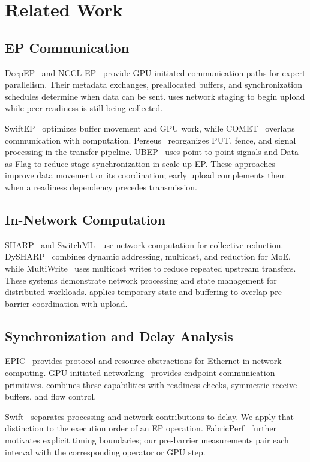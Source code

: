\section{Related Work}
\label{sec:related}

\subsection{EP Communication}
DeepEP~\cite{deepep} and NCCL EP~\cite{ncclep} provide GPU-initiated communication paths for expert parallelism. Their metadata exchanges, preallocated buffers, and synchronization schedules determine when data can be sent. \sys{} uses network staging to begin upload while peer readiness is still being collected.

SwiftEP~\cite{swiftep} optimizes buffer movement and GPU work, while COMET~\cite{comet} overlaps communication with computation. Perseus~\cite{perseus} reorganizes PUT, fence, and signal processing in the transfer pipeline. UBEP~\cite{ubep} uses point-to-point signals and Data-as-Flag to reduce stage synchronization in scale-up EP. These approaches improve data movement or its coordination; early upload complements them when a readiness dependency precedes transmission.

\subsection{In-Network Computation}
SHARP~\cite{sharp} and SwitchML~\cite{switchml} use network computation for collective reduction. DySHARP~\cite{dysharp} combines dynamic addressing, multicast, and reduction for MoE, while MultiWrite~\cite{multiwrite} uses multicast writes to reduce repeated upstream transfers. These systems demonstrate network processing and state management for distributed workloads. \sys{} applies temporary state and buffering to overlap pre-barrier coordination with upload.

\subsection{Synchronization and Delay Analysis}
EPIC~\cite{epic} provides protocol and resource abstractions for Ethernet in-network computing. GPU-initiated networking~\cite{gin} provides endpoint communication primitives. \sys{} combines these capabilities with readiness checks, symmetric receive buffers, and flow control.

Swift~\cite{swift} separates processing and network contributions to delay. We apply that distinction to the execution order of an EP operation. FabricPerf~\cite{fabricperf} further motivates explicit timing boundaries; our pre-barrier measurements pair each interval with the corresponding operator or GPU step.
